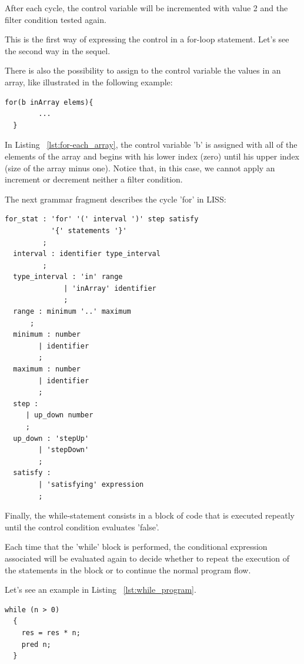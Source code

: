 \documentclass[
  oneside,
  11pt, a4paper,
  footinclude=true,
  headinclude=true,
  cleardoublepage=empty
]{scrbook}
\begin{document}
After each cycle, the control variable will be incremented with value 2 and the filter condition tested again. 

This is the first way of expressing the control in a for-loop statement. Let's see the second way in the sequel.

There is also the possibility to assign to the control variable the values in an array, like illustrated in the following example:

\begin{lstlisting}[caption={LISS syntax of a for-each statement on array},label={lst:for-each_array}]
  for(b inArray elems){
       	...
  }
\end{lstlisting}
In Listing ~\ref{lst:for-each_array}, the control variable  'b' is assigned with all of the elements of the array and begins with his lower index (zero) until his upper index (size of the array minus one).
Notice that, in this case, we cannot apply an increment or decrement neither a filter condition.

The next grammar fragment describes the cycle 'for' in LISS:

\begin{lstlisting}[caption={CFG for for-statement in LISS}]
  for_stat : 'for' '(' interval ')' step satisfy
           '{' statements '}'
         ;
  interval : identifier type_interval
         ;
  type_interval : 'in' range
              | 'inArray' identifier
              ;
  range : minimum '..' maximum
      ;
  minimum : number
        | identifier
        ;
  maximum : number
        | identifier
        ;
  step :
     | up_down number
     ;
  up_down : 'stepUp'
        | 'stepDown'
        ;
  satisfy :
        | 'satisfying' expression
        ;
\end{lstlisting}


Finally, the while-statement consists in a block of code that is executed repeatly until the control condition evaluates 'false'. 

Each time that the 'while' block is performed, the conditional expression associated will be evaluated again to decide whether to repeat the execution of the statements in the block or to continue the normal program flow.

Let's see an example in Listing ~\ref{lst:while_program}.

\begin{lstlisting}[caption={LISS syntax of a while-statement in LISS},label={lst:while_program}]
  while (n > 0)
  {
    res = res * n;
    pred n;
  }
\end{lstlisting}
\end{document}
